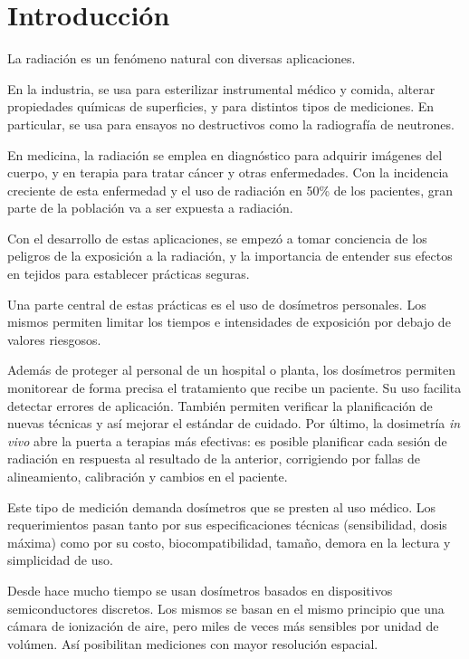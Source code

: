 \section{Introducción}
La radiación es un fenómeno natural con diversas aplicaciones.

En la industria, se usa para esterilizar instrumental médico y comida,
alterar propiedades químicas de superficies\cite{clough2001high},
y para distintos tipos de mediciones.
En particular, se usa para ensayos no destructivos
como la radiografía de neutrones\cite{berger_neutron_1960}.

En medicina, la radiación se emplea en diagnóstico para adquirir imágenes del cuerpo,
y en terapia para tratar cáncer y otras enfermedades.
Con la incidencia creciente de esta enfermedad 
y el uso de radiación en 50\% de los
pacientes\cite{symposium_assurance_dosimetry_1994},
gran parte de la población va a ser expuesta a radiación.

Con el desarrollo de estas aplicaciones,
se empezó a tomar conciencia de 
los peligros de la exposición a la radiación,
y la importancia de entender sus efectos en tejidos
para establecer prácticas seguras.

Una parte central de estas prácticas es el uso de dosímetros personales.
Los mismos permiten limitar los tiempos e intensidades de exposición
por debajo de valores riesgosos.

Además de proteger al personal de un hospital o planta,
los dosímetros permiten monitorear de forma precisa 
el tratamiento que recibe un paciente.
Su uso facilita detectar errores de aplicación\cite{noel_detection_1995}.
También permiten verificar la planificación de nuevas
técnicas y así mejorar el estándar de cuidado\cite{essers_vivo_1999}.
Por último, la dosimetría \emph{in vivo} 
abre la puerta a terapias más efectivas:
es posible planificar cada sesión de radiación
en respuesta al resultado de la anterior,
corrigiendo por fallas de alineamiento, calibración 
y cambios en el paciente\cite{wu_application_2006}.

Este tipo de medición demanda dosímetros 
que se presten al uso médico.
Los requerimientos pasan tanto por sus especificaciones técnicas
(sensibilidad, dosis máxima)
como por su costo,
biocompatibilidad, tamaño,
demora en la lectura y simplicidad de uso.

Desde hace mucho tiempo se usan dosímetros basados en 
dispositivos semiconductores discretos.
Los mismos se basan en el mismo principio que una cámara de ionización de aire,
pero miles de veces más sensibles por unidad de volúmen\cite{jones_application_1963}.
Así posibilitan mediciones con mayor resolución espacial.

